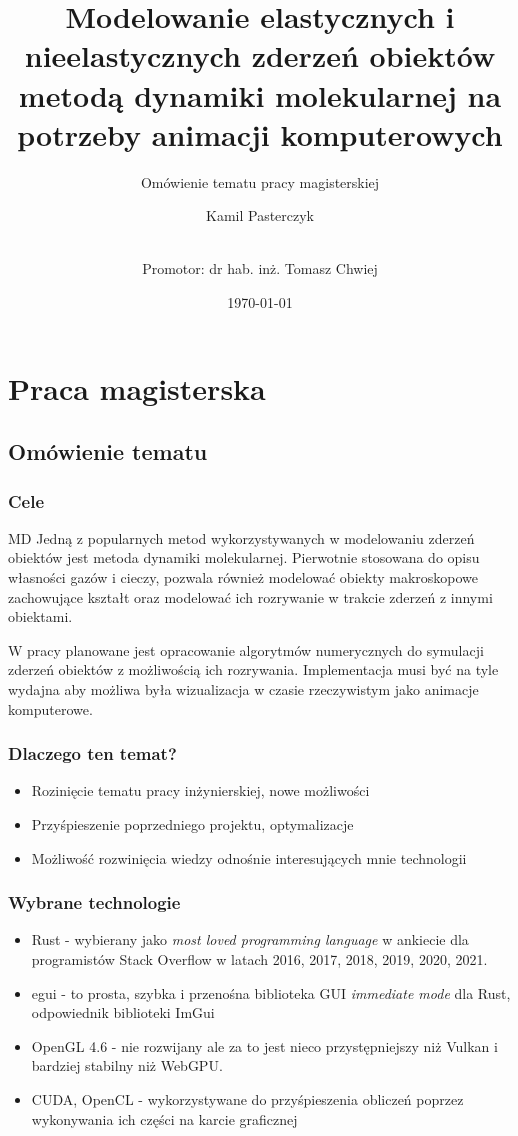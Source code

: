 \documentclass{beamer}
\title{Modelowanie elastycznych i nieelastycznych zderzeń obiektów 
metodą dynamiki molekularnej na potrzeby animacji komputerowych}
\subtitle{ Omówienie tematu pracy magisterskiej }
\author[Kamil Pasterczyk]{Kamil Pasterczyk \and \\ Promotor: dr hab. inż. Tomasz Chwiej}
\institute[AGH]{AGH University of Science and Technology}
\date{\today}
\begin{document}
\section{Praca magisterska}
\subsection{Omówienie tematu}

\begin{frame}
    \titlepage
\end{frame}

\begin{frame}
    \frametitle{Cele}

    \begin{block}{MD}
        Jedną z popularnych metod wykorzystywanych w modelowaniu zderzeń obiektów jest
        metoda dynamiki molekularnej. Pierwotnie stosowana do opisu własności gazów i
        cieczy, pozwala również modelować obiekty makroskopowe zachowujące kształt
        oraz modelować ich rozrywanie w trakcie zderzeń z innymi obiektami.
    \end{block}

    W pracy planowane jest opracowanie algorytmów numerycznych do 
    symulacji zderzeń obiektów z możliwością ich rozrywania.
    Implementacja musi być na tyle wydajna aby możliwa była wizualizacja 
     w czasie rzeczywistym jako animacje komputerowe.
\end{frame}

\begin{frame}
    \frametitle{Dlaczego ten temat?}
    \begin{itemize}
        \item Rozinięcie tematu pracy inżynierskiej, nowe możliwości
        \item Przyśpieszenie poprzedniego projektu, optymalizacje
        \item Możliwość rozwinięcia wiedzy odnośnie interesujących mnie technologii
    \end{itemize}
\end{frame}

\begin{frame}
    \frametitle{Wybrane technologie}
    \begin{itemize}
        \item Rust - wybierany jako \emph{most loved programming language} w ankiecie dla programistów
              Stack Overflow w latach 2016, 2017, 2018, 2019, 2020, 2021.
        \item egui - to prosta, szybka i przenośna biblioteka GUI \emph{immediate mode} dla Rust, odpowiednik biblioteki ImGui
        \item OpenGL 4.6 - nie rozwijany ale za to jest nieco przystępniejszy niż Vulkan i bardziej stabilny niż WebGPU.
        \item CUDA, OpenCL - wykorzystywane do przyśpieszenia obliczeń poprzez wykonywania ich części na karcie graficznej
    \end{itemize}
\end{frame}
\end{document}
